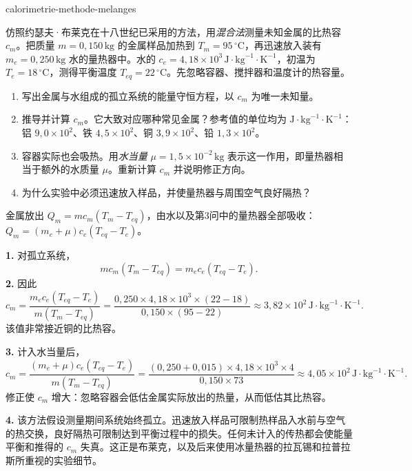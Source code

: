 \begin{exo}[用混合法测定金属的比热容]{calorimetrie-methode-melanges}

仿照约瑟夫·布莱克在十八世纪已采用的方法，用\emph{混合法}测量未知金属的比热容 $c_m$。把质量 $m=0{,}150\,\text{kg}$ 的金属样品加热到 $T_m=95\,^\circ\text{C}$，再迅速放入装有 $m_e=0{,}250\,\text{kg}$ 水的量热器中。水的 $c_e=4{,}18\times10^3\,\text{J}\!\cdot\!\text{kg}^{-1}\!\cdot\!\text{K}^{-1}$，初温为 $T_e=18\,^\circ\text{C}$，测得平衡温度 $T_{eq}=22\,^\circ\text{C}$。先忽略容器、搅拌器和温度计的热容量。
\begin{enumerate}
  \item 写出金属与水组成的孤立系统的能量守恒方程，以 $c_m$ 为唯一未知量。
  \item 推导并计算 $c_m$。它大致对应哪种常见金属？参考值的单位均为 $\text{J}\!\cdot\!\text{kg}^{-1}\!\cdot\!\text{K}^{-1}$：铝 $9{,}0\times10^2$、铁 $4{,}5\times10^2$、铜 $3{,}9\times10^2$、铅 $1{,}3\times10^2$。
  \item 容器实际也会吸热。用\emph{水当量} $\mu=1{,}5\times10^{-2}\,\text{kg}$ 表示这一作用，即量热器相当于额外的水质量 $\mu$。重新计算 $c_m$ 并说明修正方向。
  \item 为什么实验中必须迅速放入样品，并使量热器与周围空气良好隔热？
\end{enumerate}
\begin{indication}
金属放出 $Q_m=mc_m(T_m-T_{eq})$，由水以及第3问中的量热器全部吸收：$Q_m=(m_e+\mu)c_e(T_{eq}-T_e)$。
\end{indication}
\begin{solution}
\textbf{1.} 对孤立系统，
\[
mc_m(T_m-T_{eq})=m_ec_e(T_{eq}-T_e).
\]
\textbf{2.} 因此
\[
c_m=\frac{m_ec_e(T_{eq}-T_e)}{m(T_m-T_{eq})}
=\frac{0{,}250\times4{,}18\times10^3\times(22-18)}{0{,}150\times(95-22)}
\approx3{,}82\times10^2\,\text{J}\!\cdot\!\text{kg}^{-1}\!\cdot\!\text{K}^{-1}.
\]
该值非常接近铜的比热容。

\textbf{3.} 计入水当量后，
\[
c_m=\frac{(m_e+\mu)c_e(T_{eq}-T_e)}{m(T_m-T_{eq})}
=\frac{(0{,}250+0{,}015)\times4{,}18\times10^3\times4}{0{,}150\times73}
\approx4{,}05\times10^2\,\text{J}\!\cdot\!\text{kg}^{-1}\!\cdot\!\text{K}^{-1}.
\]
修正使 $c_m$ 增大：忽略容器会低估金属实际放出的热量，从而低估其比热容。

\textbf{4.} 该方法假设测量期间系统始终孤立。迅速放入样品可限制热样品入水前与空气的热交换，良好隔热可限制达到平衡过程中的损失。任何未计入的传热都会使能量平衡和推得的 $c_m$ 失真。这正是布莱克，以及后来使用冰量热器的拉瓦锡和拉普拉斯所重视的实验细节。
\end{solution}
\end{exo}

